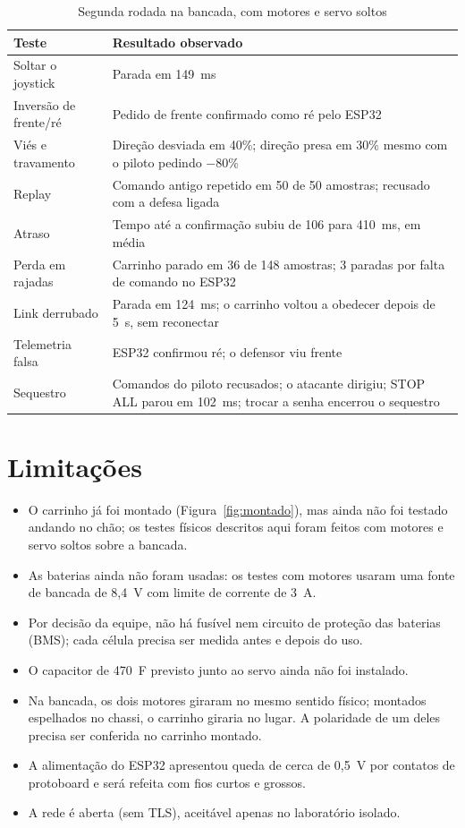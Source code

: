 \documentclass[12pt,openright,oneside,a4paper,english,brazil]{abntex2}
\begin{document}
\begin{table}[htbp]
\centering
\small
\caption{Segunda rodada na bancada, com motores e servo soltos}
\label{tab:bancada}
\begin{tabularx}{\textwidth}{@{}P{3.4cm}L@{}}
\toprule
\textbf{Teste} & \textbf{Resultado observado} \\
\midrule
Soltar o joystick & Parada em 149~ms \\
Inversão de frente/ré & Pedido de frente confirmado como ré pelo ESP32 \\
Viés e travamento & Direção desviada em 40\%; direção presa em 30\% mesmo com o piloto pedindo $-80\%$ \\
Replay & Comando antigo repetido em 50 de 50 amostras; recusado com a defesa ligada \\
Atraso & Tempo até a confirmação subiu de 106 para 410~ms, em média \\
Perda em rajadas & Carrinho parado em 36 de 148 amostras; 3 paradas por falta de comando no ESP32 \\
Link derrubado & Parada em 124~ms; o carrinho voltou a obedecer depois de 5~s, sem reconectar \\
Telemetria falsa & ESP32 confirmou ré; o defensor viu frente \\
Sequestro & Comandos do piloto recusados; o atacante dirigiu; STOP ALL parou em 102~ms; trocar a senha encerrou o sequestro \\
\bottomrule
\end{tabularx}
\end{table}

\section{Limitações}

\begin{itemize}
  \item O carrinho já foi montado (Figura~\ref{fig:montado}), mas ainda não foi testado andando no chão; os testes físicos descritos aqui foram feitos com motores e servo soltos sobre a bancada.
  \item As baterias ainda não foram usadas: os testes com motores usaram uma fonte de bancada de 8,4~V com limite de corrente de 3~A.
  \item Por decisão da equipe, não há fusível nem circuito de proteção das baterias (BMS); cada célula precisa ser medida antes e depois do uso.
  \item O capacitor de 470~\textmu F previsto junto ao servo ainda não foi instalado.
  \item Na bancada, os dois motores giraram no mesmo sentido físico; montados espelhados no chassi, o carrinho giraria no lugar. A polaridade de um deles precisa ser conferida no carrinho montado.
  \item A alimentação do ESP32 apresentou queda de cerca de 0,5~V por contatos de protoboard e será refeita com fios curtos e grossos.
  \item A rede é aberta (sem TLS), aceitável apenas no laboratório isolado.
\end{itemize}
\end{document}
